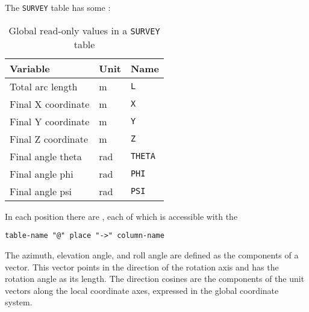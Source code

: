 The \texttt{SURVEY} table has some :
\begin{table}[Ht]
  \caption{Global read-only values in a \texttt{SURVEY} table}
  \label{tab:survey_glob}
  \begin{center}
    \begin{tabular}{|l|l|l|}
      \hline
      Variable & Unit & Name \\
      \hline
      Total arc length & m & \texttt{L}\index{L} \\
      Final X coordinate & m & \texttt{X}\index{X} \\
      Final Y coordinate & m & \texttt{Y}\index{Y} \\
      Final Z coordinate & m & \texttt{Z}\index{Z} \\
      Final angle theta & rad & \texttt{THETA}\index{THETA} \\
      Final angle phi & rad & \texttt{PHI}\index{PHI} \\
      Final angle psi & rad & \texttt{PSI}\index{PSI} \\
      \hline
    \end{tabular}
  \end{center}
\end{table}

In each position there are , 
each of which is accessible with the 
\begin{verbatim}
table-name "@" place "->" column-name
\end{verbatim}
The azimuth, elevation angle, and roll angle are defined as the
components of a vector.
This vector points in the direction of the rotation axis and has the
rotation angle as its length.
The direction cosines are the components of the unit vectors along the
local coordinate axes, expressed in the global coordinate system.

